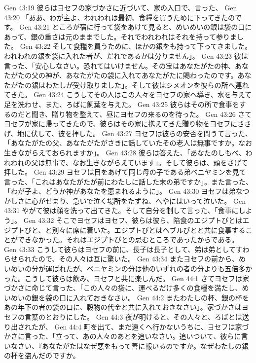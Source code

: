 Gen 43:19  彼らはヨセフの家づかさに近づいて、家の入口で、言った、
Gen 43:20  「ああ、わが主よ、われわれは最初、食糧を買うために下ってきたのです。
Gen 43:21  ところが宿に行って袋をあけて見ると、めいめいの銀は袋の口にあって、銀の重さは元のままでした。それでわれわれはそれを持って参りました。
Gen 43:22  そして食糧を買うために、ほかの銀をも持って下ってきました。われわれの銀を袋に入れた者が、だれであるかは分りません」。
Gen 43:23  彼は言った、「安心しなさい。恐れてはいけません。その宝はあなたがたの神、あなたがたの父の神が、あなたがたの袋に入れてあなたがたに賜わったのです。あなたがたの銀はわたしが受け取りました」。そして彼はシメオンを彼らの所へ連れてきた。
Gen 43:24  こうしてその人はこの人々をヨセフの家へ導き、水を与えて足を洗わせ、また、ろばに飼葉を与えた。
Gen 43:25  彼らはその所で食事をするのだと聞き、贈り物を整えて、昼にヨセフの来るのを待った。
Gen 43:26  さてヨセフが家に帰ってきたので、彼らはその家に携えてきた贈り物をヨセフにささげ、地に伏して、彼を拝した。
Gen 43:27  ヨセフは彼らの安否を問うて言った、「あなたがたの父、あなたがたがさきに話していたその老人は無事ですか。なお生きながらえておられますか」。
Gen 43:28  彼らは答えた、「あなたのしもべ、われわれの父は無事で、なお生きながらえています」。そして彼らは、頭をさげて拝した。
Gen 43:29  ヨセフは目をあげて同じ母の子である弟ベニヤミンを見て言った、「これはあなたがたが前にわたしに話した末の弟ですか」。また言った、「わが子よ、どうか神があなたを恵まれるように」。
Gen 43:30  ヨセフは弟なつかしさに心がせまり、急いで泣く場所をたずね、へやにはいって泣いた。
Gen 43:31  やがて彼は顔を洗って出てきた。そして自分を制して言った、「食事にしよう」。
Gen 43:32  そこでヨセフはヨセフ、彼らは彼ら、陪食のエジプトびとはエジプトびと、と別々に席に着いた。エジプトびとはヘブルびとと共に食事することができなかった。それはエジプトびとの忌むところであったからである。
Gen 43:33  こうして彼らはヨセフの前に、長子は長子として、弟は弟としてすわらせられたので、その人々は互に驚いた。
Gen 43:34  またヨセフの前から、めいめいの分が運ばれたが、ベニヤミンの分は他のいずれの者の分よりも五倍多かった。こうして彼らは飲み、ヨセフと共に楽しんだ。
Gen 44:1  さてヨセフは家づかさに命じて言った、「この人々の袋に、運べるだけ多くの食糧を満たし、めいめいの銀を袋の口に入れておきなさい。
Gen 44:2  またわたしの杯、銀の杯をあの年下の者の袋の口に、穀物の代金と共に入れておきなさい」。家づかさはヨセフの言葉のとおりにした。
Gen 44:3  夜が明けると、その人々と、ろばとは送り出されたが、
Gen 44:4  町を出て、まだ遠くへ行かないうちに、ヨセフは家づかさに言った、「立って、あの人々のあとを追いなさい。追いついて、彼らに言いなさい、『あなたがたはなぜ悪をもって善に報いるのですか。なぜわたしの銀の杯を盗んだのですか。
